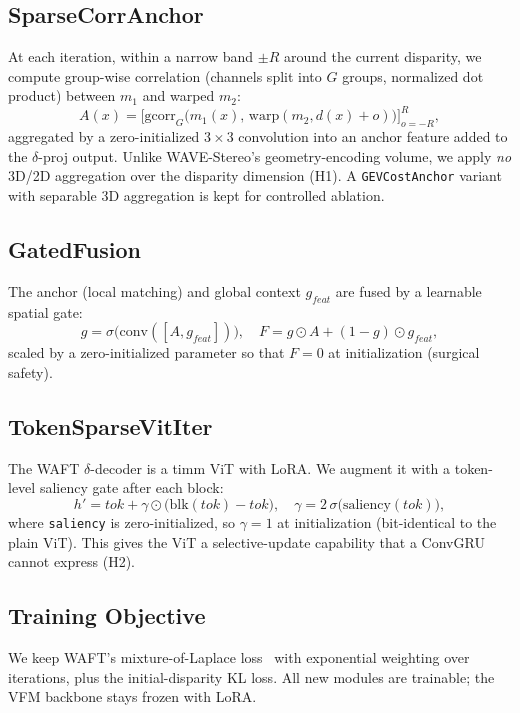 \documentclass[conference]{IEEEtran}
\begin{document}
\subsection{SparseCorrAnchor}
At each iteration, within a narrow band $\pm R$ around the current disparity, we compute group-wise correlation (channels split into $G$ groups, normalized dot product) between $m_1$ and warped $m_2$:
\begin{equation}
A(x)=\Big[\mathrm{gcorr}_G\big(m_1(x),\,\mathrm{warp}(m_2,d(x)+o)\big)\Big]_{o=-R}^{R},
\label{eq:anchor}
\end{equation}
aggregated by a zero-initialized $3{\times}3$ convolution into an anchor feature added to the $\delta$-proj output. Unlike WAVE-Stereo's geometry-encoding volume, we apply \emph{no} 3D/2D aggregation over the disparity dimension (H1). A \texttt{GEVCostAnchor} variant with separable 3D aggregation is kept for controlled ablation.

\subsection{GatedFusion}
The anchor (local matching) and global context $g_{feat}$ are fused by a learnable spatial gate:
\begin{equation}
g=\sigma\big(\mathrm{conv}([A, g_{feat}])\big),\quad
F = g\odot A + (1-g)\odot g_{feat},
\label{eq:gate}
\end{equation}
scaled by a zero-initialized parameter so that $F=0$ at initialization (surgical safety).

\subsection{TokenSparseVitIter}
The WAFT $\delta$-decoder is a timm ViT with LoRA. We augment it with a token-level saliency gate after each block:
\begin{equation}
h' = tok + \gamma\odot\big(\mathrm{blk}(tok)-tok\big),\quad
\gamma = 2\,\sigma\big(\mathrm{saliency}(tok)\big),
\label{eq:sparse}
\end{equation}
where \texttt{saliency} is zero-initialized, so $\gamma=1$ at initialization (bit-identical to the plain ViT). This gives the ViT a selective-update capability that a ConvGRU cannot express (H2).

\subsection{Training Objective}
We keep WAFT's mixture-of-Laplace loss~\cite{searaft} with exponential weighting over iterations, plus the initial-disparity KL loss. All new modules are trainable; the VFM backbone stays frozen with LoRA.
\end{document}

